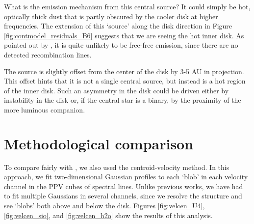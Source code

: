 \documentclass[twocolumn]{aastex61}
\begin{document}
What is the emission mechanism from this central source?
It could simply be hot, optically thick dust that is partly obscured by the
cooler disk at higher frequencies.  The  extension of this `source'
along the disk direction in Figure \ref{fig:contmodel_residuals_B6}
suggests that we are seeing the hot inner disk.
As pointed out by \citet{Plambeck2016a}, it is quite unlikely to be
free-free emission, since there are no detected recombination lines.

The source is slightly offset from the center of the disk by 3-5 AU in
projection.  This offset hints that it is not a single central source, but
instead is a hot region of the inner disk.  Such an asymmetry in the disk could
be driven either by instability in the disk or, if the central star is a
binary, by the proximity of the more luminous companion.



\appendix


\section{Methodological comparison}
\label{appendix:centroids}
To compare fairly with \citet{Plambeck2016a}, we also used the
centroid-velocity method.  In this approach, we fit two-dimensional Gaussian
profiles to each `blob' in each velocity channel in the PPV cubes of spectral
lines.  Unlike previous works, we have had to fit multiple Gaussians in several
channels, since we resolve the structure and see `blobs' both above and below
the disk.
Figures \ref{fig:velcen_U4}, \ref{fig:velcen_sio}, and \ref{fig:velcen_h2o}
show the results of this analysis.

\end{document}
